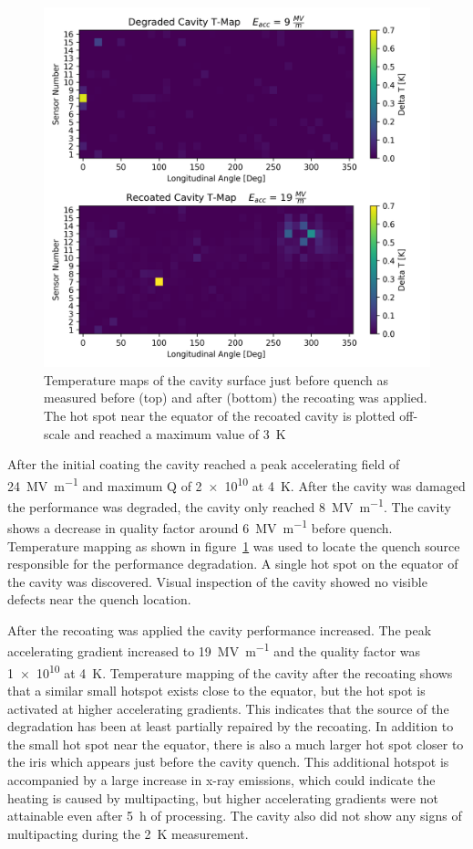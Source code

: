 \documentclass{revtex4-2}
\begin{document}
\begin{figure}[h]%
    \centering%
    \includegraphics{./figures/TMAP.png}%
    \caption{Temperature maps of the cavity surface just before quench as measured before (top) and after (bottom) the recoating was applied. The hot spot near the equator of the recoated cavity is plotted off-scale and reached a maximum value of \qty{3}{\kelvin}}%
    \label{fig:TMAP}%
\end{figure}

After the initial coating the cavity reached a peak accelerating field of \qty{24}{\mega\volt\per\meter} and maximum Q of \num{2e10} at \qty{4}{\kelvin}. After the cavity was damaged the performance was degraded, the cavity only reached \qty{8}{\mega\volt\per\meter}. The cavity shows a decrease in quality factor around \qty{6}{\mega\volt\per\meter} before quench. Temperature mapping as shown in figure~\ref{fig:TMAP} was used to locate the quench source responsible for the performance degradation. A single hot spot on the equator of the cavity was discovered. Visual inspection of the cavity showed no visible defects near the quench location.

After the recoating was applied the cavity performance increased. The peak accelerating gradient increased to \qty{19}{\mega\volt\per\meter} and the quality factor was \num{1e10} at \qty{4}{\kelvin}. Temperature mapping of the cavity after the recoating shows that a similar small hotspot exists close to the equator, but the hot spot is activated at higher accelerating gradients. This indicates that the source of the degradation has been at least partially repaired by the recoating. In addition to the small hot spot near the equator, there is also a much larger hot spot closer to the iris which appears just before the cavity quench. This additional hotspot is accompanied by a large increase in x-ray emissions, which could indicate the heating is caused by multipacting, but higher accelerating gradients were not attainable even after \qty{5}{\hour} of processing. The cavity also did not show any signs of multipacting during the \qty{2}{\kelvin} measurement.
\end{document}
